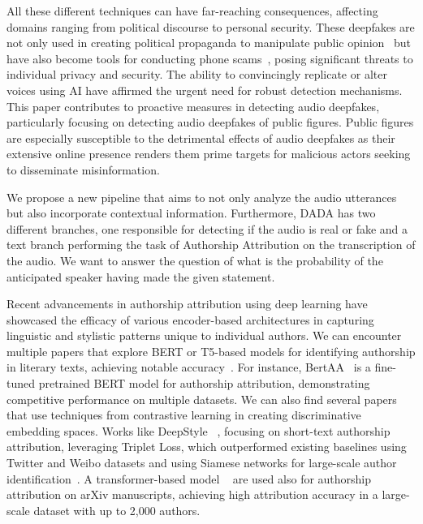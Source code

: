 \documentclass{Interspeech}
\begin{document}
All these different techniques can have far-reaching consequences, affecting
domains ranging from political discourse to personal security. These deepfakes
are not only used in creating political propaganda to manipulate public
opinion~\cite{stuanescuinformational} but have also become tools for conducting
phone scams~\cite{mirsky2022dfcaptcha}, posing significant threats to
individual privacy and security. The ability to convincingly replicate or alter
voices using AI have affirmed the urgent need for robust detection mechanisms.
This paper contributes to proactive measures in detecting audio deepfakes,
particularly focusing on detecting audio deepfakes of public figures. Public
figures are especially susceptible to the detrimental effects of audio
deepfakes as their extensive online presence renders them prime targets for
malicious actors seeking to disseminate misinformation.

We propose a new pipeline that aims to not only analyze the audio utterances
but also incorporate contextual information. Furthermore, DADA has two
different branches, one responsible for detecting if the audio is real or fake
and a text branch performing the task of Authorship Attribution on the
transcription of the audio. We want to answer the question of what is the
probability of the anticipated speaker having made the given statement.

Recent advancements in authorship attribution using deep learning have
showcased the efficacy of various encoder-based architectures in capturing
linguistic and stylistic patterns unique to individual authors. We can
encounter multiple papers that explore BERT or T5-based models for identifying
authorship in literary texts, achieving notable
accuracy~\cite{hicke2023t5,silva2024forged}. For instance,
BertAA~\cite{fabien2020bertaa} is a fine-tuned pretrained BERT model for
authorship attribution, demonstrating competitive performance on multiple
datasets. We can also find several papers that use techniques from contrastive
learning in creating discriminative embedding spaces. Works like
DeepStyle ~\cite{hu2020deepstyle}, focusing on short-text authorship
attribution, leveraging Triplet Loss, which outperformed existing baselines
using Twitter and Weibo datasets and using Siamese networks for large-scale
author identification~\cite{saedi2021siamese}. A transformer-based model ~\cite{bauersfeld2023cracking} are used also for authorship attribution on arXiv manuscripts, achieving high attribution accuracy in a large-scale dataset with up to 2,000 authors.
\end{document}
